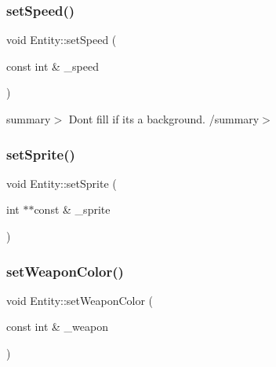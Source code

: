 \mbox{\label{class_entity_a5bc0abf3c642eba79f73ffc0286af93c}} 
\subsubsection{\texorpdfstring{set\+Speed()}{setSpeed()}}
{\footnotesize\ttfamily void Entity\+::set\+Speed (\begin{DoxyParamCaption}\item[{const int \&}]{\+\_\+speed }\end{DoxyParamCaption})\hspace{0.3cm}{\ttfamily [inline]}}

summary$>$ Don\textquotesingle{}t fill if it\textquotesingle{}s a background. /summary$>$ \mbox{\label{class_entity_a740d16e74f00128729a49e4c55a519b3}} 
\subsubsection{\texorpdfstring{set\+Sprite()}{setSprite()}}
{\footnotesize\ttfamily void Entity\+::set\+Sprite (\begin{DoxyParamCaption}\item[{int $\ast$$\ast$const \&}]{\+\_\+sprite }\end{DoxyParamCaption})}

\mbox{\label{class_entity_a50581d944ca47f6da2f2d909edeaf858}} 
\subsubsection{\texorpdfstring{set\+Weapon\+Color()}{setWeaponColor()}}
{\footnotesize\ttfamily void Entity\+::set\+Weapon\+Color (\begin{DoxyParamCaption}\item[{const int \&}]{\+\_\+weapon }\end{DoxyParamCaption})\hspace{0.3cm}{\ttfamily [inline]}}

\mbox{\label{class_entity_aae47a4b97f40f4fbf42b35c90f3db3d4}} 
